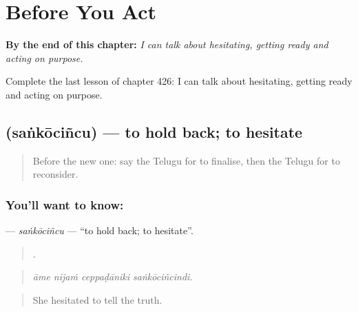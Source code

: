 
\chapter{Before You Act}
\label{ch:te-before-you-act}

\begin{chapteropening}
\textbf{By the end of this chapter:} \emph{I can talk about hesitating, getting ready and acting on purpose.}

Complete the last lesson of chapter 426: I can talk about hesitating, getting ready and acting on purpose.
\end{chapteropening}

\section[\texorpdfstring{\te{సంకోచించు} (saṅkōciñcu)}{సంకోచించు (saṅkōciñcu)}]{ (saṅkōciñcu) — to hold back; to hesitate}

\label{lesson:TE-C426-sankocincu}



\begin{quote}
Before the new one: say the Telugu for to finalise, then the Telugu for to reconsider.
\end{quote}

\subsection*{You'll want to know: }
\textbf{} — \emph{saṅkōciñcu} — \textquotedblleft{}to hold back; to hesitate\textquotedblright{}.

\begin{quote}
   .
\end{quote}

\begin{quote}
\emph{āme nijaṁ ceppaḍāniki saṅkōciñcindi.}
\end{quote}

\begin{quote}
She hesitated to tell the truth.
\end{quote}

